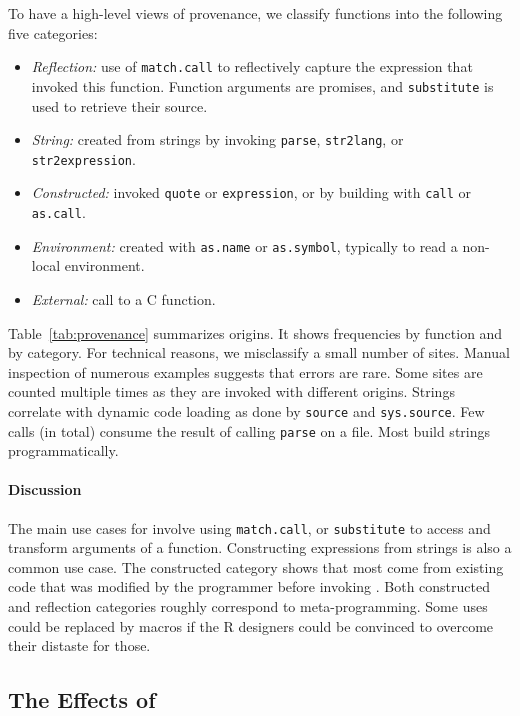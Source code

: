 \documentclass[review,screen,acmsmall]{acmart}%
\renewcommand{\k}[1]{\lstinline |#1|\xspace}
\begin{document}
To have a high-level views of provenance, we classify functions into the
following five categories:

\begin{itemize}[---]
\item {\it Reflection:} use of \k{match.call} to reflectively capture the
  expression that invoked this function. Function arguments are promises, and
  \k{substitute} is used to retrieve their source. 
\item {\it String:} created from strings by invoking \k{parse},
  \k{str2lang}, or \k{str2expression}.
\item {\it Constructed:} invoked \k{quote} or \k{expression}, or by building with
  \k{call} or \k{as.call}.
\item {\it Environment: } created with \k{as.name} or \k{as.symbol}, typically
  to read a non-local environment.
\item {\it External: }  call to a C function. 
\end{itemize}

Table~\ref{tab:provenance} summarizes origins. It shows frequencies by function
and by category. For technical reasons, we misclassify a small number of sites.
Manual inspection of numerous examples suggests that errors are rare. Some sites
are counted multiple times as they are invoked with different origins. Strings
correlate with dynamic code loading as done by \k{source} and \k{sys.source}.
Few calls (\packageNbParseFromFileSites in total) consume the result of calling
\k{parse} on a file. Most build strings programmatically.


\paragraph{Discussion}
The main use cases for \eval involve using \k{match.call}, or \k{substitute} to access and transform arguments of a function. Constructing
expressions from strings is also a common use case. The constructed category
shows that most \evals come from existing code that was modified by the
programmer before invoking \eval. Both constructed and reflection categories
roughly correspond to meta-programming. Some uses could be replaced by
macros if the R designers could be convinced to overcome their distaste for
those.

\subsection{The Effects of \Eval}
\end{document}
